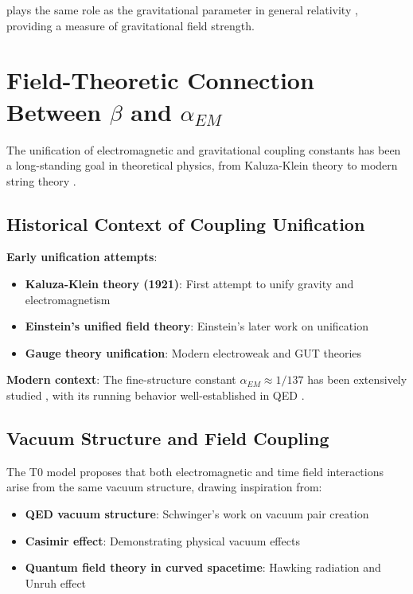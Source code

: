 \documentclass[12pt,a4paper]{article}
\begin{document}
	plays the same role as the gravitational parameter in general relativity \citep{weinberg1972}, providing a measure of gravitational field strength.
	
	\section{Field-Theoretic Connection Between $\beta$ and $\alpha_{EM}$}
	\label{sec:beta_alpha_connection}
	
	The unification of electromagnetic and gravitational coupling constants has been a long-standing goal in theoretical physics, from Kaluza-Klein theory \citep{kaluza1921,klein1926} to modern string theory \citep{green1987,polchinski1998}.
	
	\subsection{Historical Context of Coupling Unification}
	\label{subsec:coupling_unification_history}
	
	\textbf{Early unification attempts}:
	\begin{itemize}
		\item \textbf{Kaluza-Klein theory (1921)}: First attempt to unify gravity and electromagnetism \citep{kaluza1921,klein1926}
		\item \textbf{Einstein's unified field theory}: Einstein's later work on unification \citep{einstein1955}
		\item \textbf{Gauge theory unification}: Modern electroweak \citep{weinberg1967,salam1968} and GUT theories \citep{georgi1974}
	\end{itemize}
	
	\textbf{Modern context}:
	The fine-structure constant $\alpha_{EM} \approx 1/137$ has been extensively studied \citep{sommerfeld1916,feynman1985}, with its running behavior well-established in QED \citep{peskin1995}.
	
	\subsection{Vacuum Structure and Field Coupling}
	\label{subsec:vacuum_structure}
	
	The T0 model proposes that both electromagnetic and time field interactions arise from the same vacuum structure, drawing inspiration from:
	\begin{itemize}
		\item \textbf{QED vacuum structure}: Schwinger's work on vacuum pair creation \citep{schwinger1951}
		\item \textbf{Casimir effect}: Demonstrating physical vacuum effects \citep{casimir1948}
		\item \textbf{Quantum field theory in curved spacetime}: Hawking radiation \citep{hawking1975} and Unruh effect \citep{unruh1976}
	\end{itemize}
	
\end{document}
